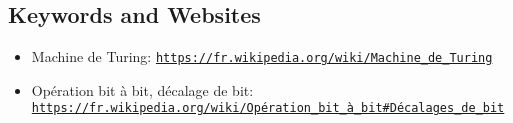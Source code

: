 \documentclass[a4paper,11pt]{report}
\newcommand{\BrochureUrlText}[1]{\texttt{#1}}
\begin{document}
{\raggedright

\subsection*{Keywords and Websites}

\begin{itemize}
  \item Machine de Turing: \href{https://fr.wikipedia.org/wiki/Machine_de_Turing}{\BrochureUrlText{https://fr.wikipedia.org/wiki/Machine\_de\_Turing}}
  \item Opération bit à bit, décalage de bit: \href{https://fr.wikipedia.org/wiki/Op\%C3\%A9ration_bit_\%C3\%A0_bit\#D\%C3\%A9calages_de_bit}{\BrochureUrlText{https://fr.wikipedia.org/wiki/Opération\_bit\_à\_bit\#Décalages\_de\_bit}}
\end{itemize}


}
\end{document}
